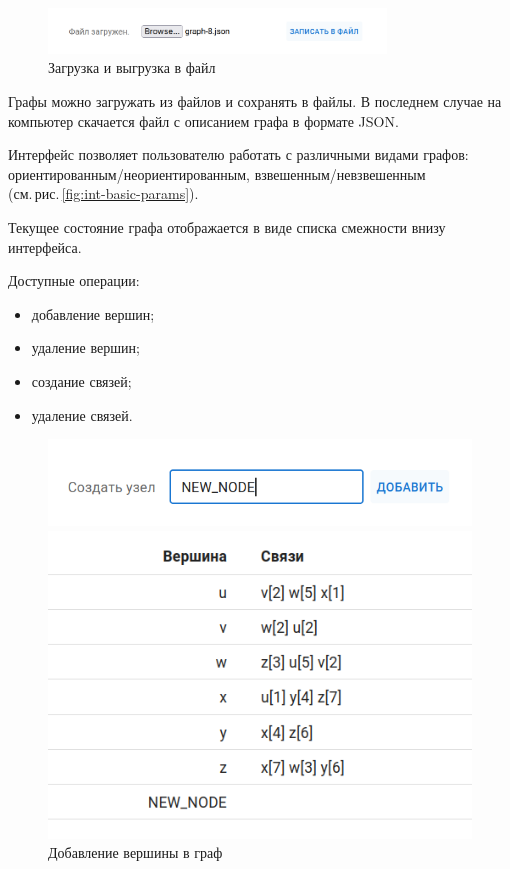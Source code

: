 \begin{figure}
  \centering\includegraphics[width=0.8\textwidth]{figs/task-1/int-6.png}
  \caption{Загрузка и выгрузка в файл}
  \label{fig:int-file-io}
\end{figure}

Графы можно загружать из файлов и сохранять в файлы. В последнем случае
на компьютер скачается файл с описанием графа в формате JSON.

Интерфейс позволяет пользователю работать с различными видами графов:
ориентированным/неориентированным, взвешенным/невзвешенным\\
(см.\,рис.\,\ref{fig:int-basic-params}).

Текущее состояние графа отображается в виде списка смежности внизу
интерфейса.

Доступные операции:
\begin{itemize}
  \item добавление вершин;
  \item удаление вершин;
  \item создание связей;
  \item удаление связей.
\end{itemize}

\begin{figure}
  \begin{minipage}{0.5\textwidth}
    \centering\includegraphics[width=0.8\linewidth]{figs/task-1/int-4.png}
  \end{minipage}
  \begin{minipage}{0.5\textwidth}
    \centering\includegraphics[width=0.7\linewidth]{figs/task-1/int-5.png}
  \end{minipage}
  \caption{Добавление вершины в граф}
  \label{fig:int-node-add}
\end{figure}

